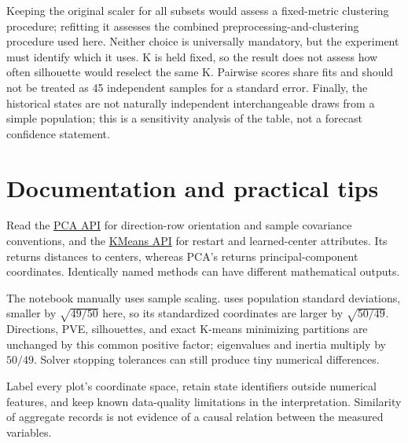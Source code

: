 Keeping the original scaler for all subsets would assess a fixed-metric clustering procedure; refitting it assesses the combined
preprocessing-and-clustering procedure used here. Neither choice is universally mandatory, but the experiment must identify which it uses.
K is held fixed, so the result does not assess how often silhouette would reselect the same K.
Pairwise scores share fits and should not be treated as 45 independent samples for a standard error.
Finally, the historical states are not naturally independent interchangeable draws from a simple population;
this is a sensitivity analysis of the table, not a forecast confidence statement.

\section*{Documentation and practical tips}
Read the \href{https://scikit-learn.org/1.8/modules/generated/sklearn.decomposition.PCA.html}{PCA API}
for direction-row orientation and sample covariance conventions, and the
\href{https://scikit-learn.org/1.8/modules/generated/sklearn.cluster.KMeans.html}{KMeans API}
for restart and learned-center attributes. Its  returns distances to centers, whereas PCA's 
returns principal-component coordinates. Identically named methods can have different mathematical outputs.

The notebook manually uses sample scaling.  uses population standard deviations, smaller by
$\sqrt{49/50}$ here, so its standardized coordinates are larger by $\sqrt{50/49}$.
Directions, PVE, silhouettes, and exact K-means minimizing partitions are unchanged by this common positive factor;
eigenvalues and inertia multiply by $50/49$. Solver stopping tolerances can still produce tiny numerical differences.

Label every plot's coordinate space, retain state identifiers outside numerical features, and keep known data-quality limitations in the interpretation.
Similarity of aggregate records is not evidence of a causal relation between the measured variables.

